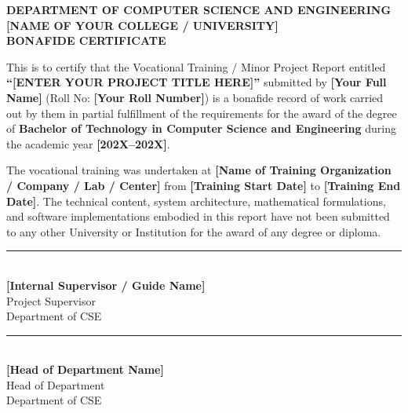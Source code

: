 \documentclass[11pt, a4paper]{article}
\begin{document}
\clearpage

\begin{center}
    {\Large \textbf{DEPARTMENT OF COMPUTER SCIENCE AND ENGINEERING}}\\[0.2cm]
    {\large \textbf{[NAME OF YOUR COLLEGE / UNIVERSITY]}}\\[0.6cm]
    {\LARGE \textbf{BONAFIDE CERTIFICATE}}\\[0.8cm]
\end{center}

This is to certify that the Vocational Training / Minor Project Report entitled \textbf{``[ENTER YOUR PROJECT TITLE HERE]''} submitted by \textbf{[Your Full Name]} (Roll No: \textbf{[Your Roll Number]}) is a bonafide record of work carried out by them in partial fulfillment of the requirements for the award of the degree of \textbf{Bachelor of Technology in Computer Science and Engineering} during the academic year \textbf{[202X--202X]}.

The vocational training was undertaken at \textbf{[Name of Training Organization / Company / Lab / Center]} from \textbf{[Training Start Date]} to \textbf{[Training End Date]}. The technical content, system architecture, mathematical formulations, and software implementations embodied in this report have not been submitted to any other University or Institution for the award of any degree or diploma.

\vspace{2.5cm}

\noindent
\begin{minipage}{0.45\textwidth}
    \rule{6cm}{0.4pt}\\[0.1cm]
    \textbf{[Internal Supervisor / Guide Name]}\\[0.1cm]
    Project Supervisor\\
    Department of CSE
\end{minipage}
\hfill
\begin{minipage}{0.45\textwidth}
    \begin{flushright}
        \rule{6cm}{0.4pt}\\[0.1cm]
        \textbf{[Head of Department Name]}\\[0.1cm]
        Head of Department\\
        Department of CSE
    \end{flushright}
\end{minipage}
\end{document}
